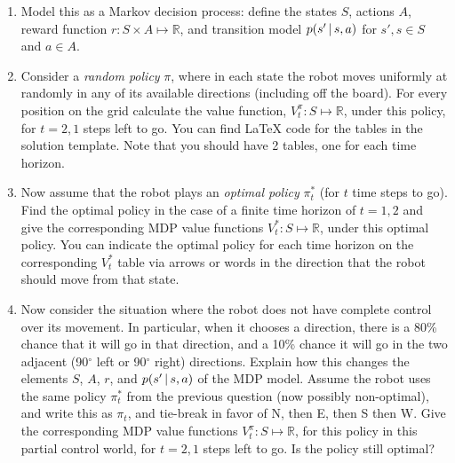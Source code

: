 \documentclass[submit]{harvardml}
\begin{document}
\begin{problem}
  \begin{enumerate}
    \item Model this as a Markov decision process: define the states $S$, actions $A$, reward function $r:S\times A\mapsto \mathbb{R}$, and transition model $p(s'\,|\, s, a)$ for $s', s\in S$ and $a\in A$.
%
    \item Consider a \emph{random policy} $\pi$, where
in each state the robot moves uniformly at randomly in any of its available directions (including off the board). 
      For every position on the grid calculate the
value function, $V^\pi_t: S\mapsto 
\mathbb{R}$, under this policy, for $t=2, 1$ steps left
to go. You can find LaTeX code for the tables in the solution template. Note that you should have 2 tables, one for each time horizon. 
%
    \item Now assume that the robot plays an \emph{optimal policy}
      $\pi^\ast_t$ (for $t$ time steps to go). Find the optimal policy in the case of a finite time horizon of $t = 1, 2$ and give the corresponding 
MDP value functions $V^\ast_t: S\mapsto 
\mathbb{R}$, under this
optimal policy. You can indicate the optimal policy for each time horizon on the corresponding $V^\ast_t$ table via arrows or words in the direction that the robot should move from that state. 
    \item Now consider the situation where the robot does not have
      complete control over its movement. In particular, 
when it chooses a direction, there is a 80\% chance that it will go in
      that direction, and a 10\% chance it will go in the two adjacent
      (90$^\circ$ left or 90$^\circ$ right) 
directions. Explain how this changes the elements $S$, $A$, $r$, and $p(s' \,|\, s,a)$ of the MDP model. 
Assume the robot uses the same
 policy $\pi^\ast_t$ from the previous question (now possibly
      non-optimal), and write this as $\pi_t$, and tie-break in favor of N, then E, then S then W.
Give the corresponding 
MDP value functions $V^\pi_t: S\mapsto 
\mathbb{R}$, for this policy in this partial control world, for $t=2, 1$ steps left
to go. Is the policy still optimal?
  \end{enumerate}
\end{problem}
\end{document}
